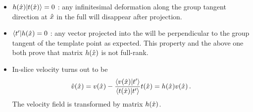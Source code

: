 \begin{itemize}
\item $h(\sspRed)\ket{\groupTan(\sspRed)}=0$ :
  any infinitesimal deformation along the group tangent direction
  at $\hat{x}$ in the full {\statesp} will disappear after projection.

\item $\bra{\sliceTan{}}h(\sspRed)=0$ : any vector projected into the {\slice} will be
  perpendicular to the group tangent of the template point as expected. This
  property and the above one both prove that matrix $h(\hat{x})$ is not full-rank.

\item In-slice velocity  turns out to be
  \[
    \velRed(\sspRed)= \vel(\sspRed)
    -\frac{\braket{\vel(\sspRed)}{\sliceTan{}}}{\braket{\groupTan(\sspRed)}{\sliceTan{}}}
    \groupTan(\sspRed)=h(\sspRed)\vel(\sspRed)
    \,.
  \]
  The velocity field is transformed by matrix $h(\hat{x})$.
\end{itemize}

